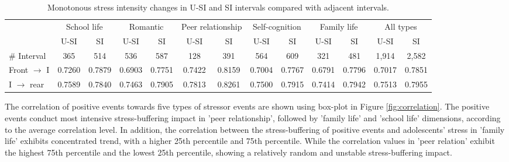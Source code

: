 \begin{table}
\begin{center}
\caption{\small{Monotonous stress intensity changes in U-SI and SI intervals compared with adjacent intervals.}}
\small{
\begin{tabular}{l cccccc cccccc} \\\hline\hline
\multirow{2}{1cm}{}
&\multicolumn{2}{c}{School life}
&\multicolumn{2}{c}{Romantic}
&\multicolumn{2}{c}{Peer relationship}
&\multicolumn{2}{c}{Self-cognition}
&\multicolumn{2}{c}{Family life}
&\multicolumn{2}{c}{All types}\\
&U-SI	    &	SI	        &U-SI	    &SI	        &U-SI	   &SI	
&U-SI	    &	SI	        &	U-SI	&SI	        &U-SI	   &SI\\  \hline
\# Interval         &   365	        &	514	        &	536	        &	587	        &128	    &	391	        &	564	           &	609	            &	321	        &	481	        &	1,914	    &2,582	 \\
Front $\rightarrow$ I &	0.7260 	&	0.7879 	&	0.6903 	&	0.7751 	&	0.7422 	&	0.8159 	&	0.7004 	&	0.7767 	&	0.6791 &	0.7796 	&	0.7017 	&   0.7851\\
I $\rightarrow$ rear  &	0.7589 	&	0.7840 	&	0.7463 	&	0.7905 	&	0.7813 	&	0.8261 	&	0.7500 	&	0.7915 	&	0.7414 	&	0.7942 	&	0.7513 	&   0.7955\\ \hline \hline
\end{tabular}}%
\label{tab:fontrear}
\end{center}
\end{table}

The correlation of positive events towards five types of stressor events
are shown using box-plot in Figure \ref{fig:correlation}.
The positive events conduct most intensive stress-buffering impact in 'peer relationship',
followed by 'family life' and 'school life' dimensions,
according to the average correlation level.
In addition,
the correlation between the stress-buffering of positive events
and adolescents' stress in 'family life'
exhibits concentrated trend,
with a higher 25th percentile and 75th percentile.
While the correlation values in 'peer relation'
exhibit the highest 75th percentile and the lowest 25th percentile,
showing a relatively random and unstable stress-buffering impact.

